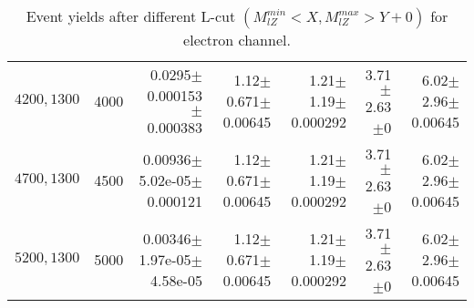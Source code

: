 \documentclass[]{article}
\begin{document}
\begin{table}
\begin{center}
{\begin{tabular}{ |r|r|r|r|r|r|r|}
$4200,1300$ & 4000 & 0.0295$\pm$0.000153$\pm$0.000383 & 1.12$\pm$0.671$\pm$0.00645 & 1.21$\pm$1.19$\pm$0.000292 & 3.71$\pm$2.63$\pm$0 & 6.02$\pm$2.96$\pm$0.00645 \\
$4700,1300$ & 4500 & 0.00936$\pm$5.02e-05$\pm$0.000121 & 1.12$\pm$0.671$\pm$0.00645 & 1.21$\pm$1.19$\pm$0.000292 & 3.71$\pm$2.63$\pm$0 & 6.02$\pm$2.96$\pm$0.00645 \\
$5200,1300$ & 5000 & 0.00346$\pm$1.97e-05$\pm$4.58e-05 & 1.12$\pm$0.671$\pm$0.00645 & 1.21$\pm$1.19$\pm$0.000292 & 3.71$\pm$2.63$\pm$0 & 6.02$\pm$2.96$\pm$0.00645 \\
\hline 
\end{tabular}
}
\end{center}
\caption{Event yields after different L-cut $(M_{lZ}^{min} < X, M_{lZ}^{max} > Y + 0)$ for electron channel.}
\end{table}
\end{document}
